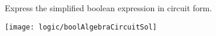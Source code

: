\begin{blocksection}
\question

Express the simplified boolean expression in circuit form.

\begin{solution}

\texttt{[image: logic/boolAlgebraCircuitSol]}

\end{solution}

\end{blocksection}